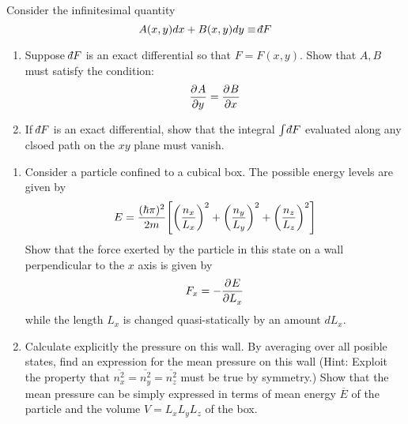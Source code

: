\documentclass{article}
\begin{document}
\begin{problem}[Reif 2.5]
    Consider the infinitesimal quantity $$A(x,y)dx+B(x,y)dy\equiv\dbar F$$
    \begin{enumerate}[label=(\alph*)]
        \item Suppose $\dbar F$ is an exact differential so that $F=F(x,y)$. Show that $A,B$ must satisfy the condition: $$\pder{A}{y}=\pder{B}{x}$$
        \item If $\dbar F$ is an exact differential, show that the integral $\int \dbar F$ evaluated along any clsoed path on the $xy$ plane must vanish.
    \end{enumerate}
    \answerline
\end{problem}\newpage
\begin{problem}[Reif 2.7]
    \begin{enumerate}[label=(\alph*)]
        \item Consider a particle confined to a cubical box. The possible energy levels are given by $$E=\frac{(\hbar \pi)^2}{2m}\qty[\qty(\frac{n_x}{L_x})^2+ \qty(\frac{n_y}{L_y})^2+ \qty(\frac{n_z}{L_z})^2]$$ Show that the force exerted by the particle in this state on a wall perpendicular to the $x$ axis is given by $$F_x=-\pder{E}{L_x}$$ while the length $L_x$ is changed quasi-statically by an amount $d L_x$.
        \item Calculate explicitly the pressure on this wall. By averaging over all posible states, find an expression for the mean pressure on this wall (Hint: Exploit the property that $\overline{n_x^2}=\overline{n_y^2}=\overline{n_z^2}$ must be true by symmetry.) Show that the mean pressure can be simply expressed in terms of mean energy $\overline{E}$ of the particle and the volume $V=L_xL_yL_z$ of the box.  
    \end{enumerate}
    \answerline
\end{problem}\newpage
\end{document}
